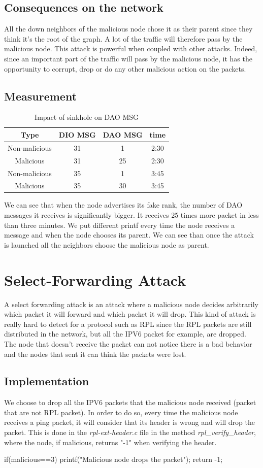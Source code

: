 \documentclass{report}
\begin{document}
\subsection*{Consequences on the network}
All the down neighbors of the malicious node chose it as their parent since they think it's the root of the graph. A lot of the traffic will therefore pass by the malicious node. This attack is powerful when coupled with other attacks. Indeed, since an important part of the traffic will pass by the malicious node, it has the opportunity to corrupt, drop or do any other malicious action on the packets.
\subsection*{Measurement}
\begin{table}[h!]
	\centering
	\caption{Impact of  sinkhole on DAO MSG}
	\begin{tabular}{cccc}
		\toprule
		Type&DIO MSG & DAO MSG&time\\
		\midrule
		Non-malicious&31&1&2:30\\
		Malicious&31&25&2:30\\
		Non-malicious&35&1&3:45\\%
		Malicious&35&30&3:45\\
		\bottomrule
	\end{tabular}
\end{table}
We can see that when the node advertises its fake rank, the number of DAO messages it receives is significantly bigger. It receives 25 times more packet in less than three minutes. We put different printf every time the node receives a message and when the node chooses its parent. We can see than once the attack is launched all the neighbors choose the malicious node as parent. 

\section{Select-Forwarding Attack}
A select forwarding attack is an attack where a malicious node decides arbitrarily which packet it will forward and which packet it will drop. This kind of attack is really hard to detect for a protocol such as RPL since the RPL packets are still distributed in the network, but all the IPV6 packet for example, are dropped. The node that doesn't receive the packet can not notice there is a bad behavior and the nodes that sent it can think the packets were lost. 
\subsection*{Implementation}
We choose to drop all the IPV6 packets that the malicious node received (packet that are not RPL packet). In order to do so, every time the malicious node receives a ping packet, it will consider that its header is wrong and will drop the packet. This is done in the \textit{rpl-ext-header.c} file in the method \textit{rpl\_verify\_header}, where the node, if malicious, returns "-1" when verifying the header.  
\begin{myc}
if(malicious==3){
	printf("Malicious node drops the packet\n");
	return -1;
}	
\end{myc}
\end{document}
